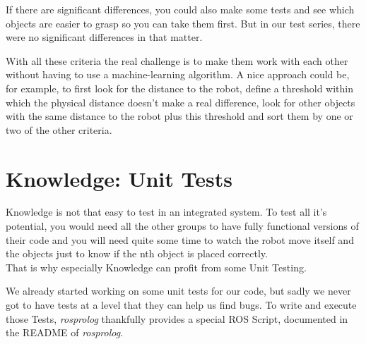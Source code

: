 \documentclass[main.tex]{subfiles}
\begin{document}
		If there are significant differences, you could also make some tests and see which objects are easier to grasp so you can take them first. But in our test series, there were no significant differences in that matter. 
		
		With all these criteria the real challenge is to make them work with each other without having to use a machine-learning algorithm. A nice approach could be, for example, to first look for the distance to the robot, define a threshold within which the physical distance doesn't make a real difference, look for other objects with the same distance to the robot plus this threshold and sort them by one or two of the other criteria. 
		
		\section{Knowledge: Unit Tests}
		Knowledge is not that easy to test in an integrated system. To test all it's potential, you would need all the other groups to have fully functional versions of their code and you will need quite some time to watch the robot move itself and the objects just to know if the nth object is placed correctly.\\
		That is why especially Knowledge can profit from some Unit Testing.
		
		We already started working on some unit tests for our code, but sadly we never got to have tests at a level that they can help us find bugs. To write and execute those Tests, \textit{rosprolog} thankfully provides a special ROS Script, documented in the README of \textit{rosprolog}.


		
\end{document}
